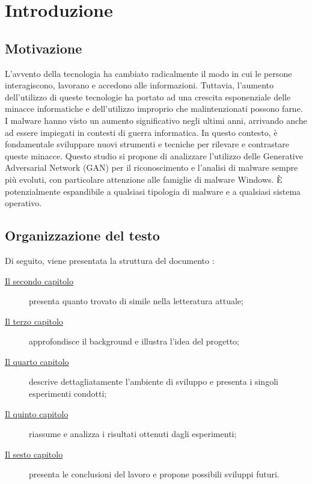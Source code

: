 \chapter{Introduzione}
\label{cap:introduzione}

\section{Motivazione}
L'avvento della tecnologia ha cambiato radicalmente il modo in cui le persone interagiscono, lavorano e accedono alle informazioni. 
Tuttavia, l'aumento dell'utilizzo di queste tecnologie ha portato ad una crescita esponenziale delle minacce informatiche e dell'utilizzo improprio che malintenzionati possono farne. I malware hanno visto un aumento significativo negli ultimi anni, arrivando anche ad essere impiegati in contesti di guerra informatica. 
In questo contesto, è fondamentale sviluppare nuovi strumenti e tecniche per rilevare e contrastare queste minacce. Questo studio si propone di analizzare l'utilizzo delle Generative Adversarial Network (GAN) per il riconoscimento e l'analisi di malware sempre più evoluti, con particolare attenzione alle famiglie di malware Windows. È potenzialmente espandibile a qualsiasi tipologia di malware e a qualsiasi sistema operativo.


\section{Organizzazione del testo}
\indent Di seguito, viene presentata la struttura del documento :
\begin{description}
    \item[{\hyperref[cap:RelatedWorks]{Il secondo capitolo}}] presenta quanto trovato di simile nella letteratura attuale;

    \item[{\hyperref[cap:descrizione]{Il terzo capitolo}}] approfondisce il background e illustra l'idea del progetto;
    
    \item[{\hyperref[cap:processi-metodologie]{Il quarto capitolo}}] descrive dettagliatamente l'ambiente di sviluppo e presenta i singoli esperimenti condotti;

    \item[{\hyperref[cap:risultati]{Il quinto capitolo}}] riassume e analizza i risultati ottenuti dagli esperimenti;
    
    \item[{\hyperref[cap:conclusioni]{Il sesto capitolo}}] presenta le conclusioni del lavoro e propone possibili sviluppi futuri.
\end{description}
